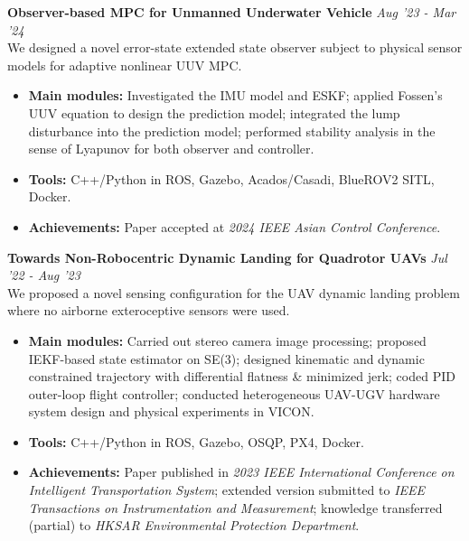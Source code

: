 \documentclass[overlapped]{res}
\begin{document}
\begin{resume}
\textbf{Observer-based MPC for Unmanned Underwater Vehicle}  
\hfill \textit{Aug '23 - Mar  '24} \\
We designed a novel error-state extended state observer subject to physical sensor models for adaptive nonlinear UUV MPC. 

\begin{itemize}
  \item \textbf{Main modules:} Investigated the IMU model and ESKF; applied Fossen's UUV equation to design the prediction model; integrated the lump disturbance into the prediction model; performed stability analysis in the sense of Lyapunov for both observer and controller.
  \item \textbf{Tools:} C++/Python in ROS, Gazebo, Acados/Casadi, BlueROV2 SITL, Docker.
  \item \textbf{Achievements:} Paper accepted at \textit{2024 IEEE Asian Control Conference}.
\end{itemize}

\textbf{Towards Non-Robocentric Dynamic Landing for Quadrotor UAVs} 
\hfill \textit{Jul '22 - Aug  '23} \\
We proposed a novel sensing configuration for the UAV dynamic landing problem where no airborne exteroceptive sensors were used.

\begin{itemize}
  \item \textbf{Main modules:} Carried out stereo camera image processing; proposed IEKF-based state estimator on SE(3); designed kinematic and dynamic constrained trajectory with differential flatness \& minimized jerk; coded PID outer-loop flight controller; conducted heterogeneous UAV-UGV hardware system design and physical experiments in VICON.
  \item \textbf{Tools:} C++/Python in ROS, Gazebo, OSQP, PX4, Docker.
  \item \textbf{Achievements:} Paper published in \textit{2023 IEEE International Conference on Intelligent Transportation System}; extended version submitted to \textit{IEEE Transactions on Instrumentation and Measurement}; knowledge transferred (partial) to \textit{HKSAR Environmental Protection Department}.
\end{itemize}



\end{resume}
\end{document}
